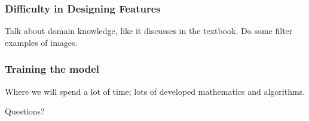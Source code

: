 \documentclass{beamer}
\theoremstyle{example}
\begin{document}
\begin{frame}
\frametitle{Difficulty in Designing Features}

Talk about domain knowledge, like it discusses in the textbook. Do some filter examples of images.
\pause

\end{frame}

\begin{frame}
\frametitle{Training the model}
Where we will spend a lot of time; lots of developed mathematics and algorithms.
\end{frame}

{
\begin{frame}[standout]
    Questions?
\end{frame}
}
\end{document}
